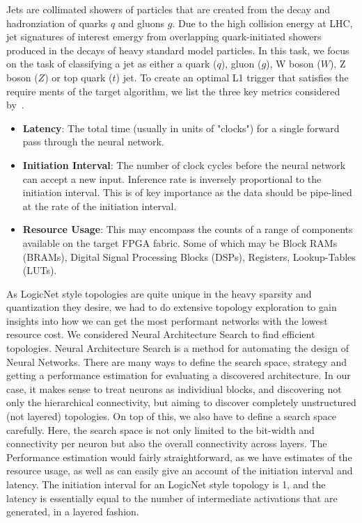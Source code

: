 Jets are collimated showers of particles that are created from the decay and hadronziation of quarks $q$ and gluons $g$. Due to the high collision energy at LHC, jet signatures of interest emergy from overlapping quark-initiated showers produced in the decays of heavy standard model particles.
In this task, we focus on the task of classifying a jet as either a quark ($q$), gluon ($g$), W boson ($W$), Z boson ($Z$) or top quark ($t$) jet. 
To create an optimal L1 trigger that satisfies the require  ments of the target algorithm, we list the three key metrics considered by~\cite{Duarte_2018}. 
\begin{itemize}
    \item \textbf{Latency}: The total time (usually in units of "clocks") for a single forward pass through the neural network.
    \item \textbf{Initiation Interval}: The number of clock cycles before the neural network can accept a new input. Inference rate is inversely proportional to the initiation interval. This is of key importance as the data should be pipe-lined at the rate of the initiation interval.
    \item \textbf{Resource Usage}: This may encompass the counts of a range of components available on the target FPGA fabric. Some of which may be Block RAMs (BRAMs), Digital Signal Processing Blocks (DSPs), Registers, Lookup-Tables (LUTs).
\end{itemize}
As LogicNet style topologies are quite unique in the heavy sparsity and quantization they desire, we had to do extensive topology exploration to gain insights into how we can get the most performant networks with the lowest resource cost.
We considered Neural Architecture Search to find efficient topologies. Neural Architecture Search is a method for automating the design of Neural Networks. There are many ways to define the search space, strategy and getting a performance estimation for evaluating a discovered architecture. In our case, it makes sense to treat neurons as individiual blocks, and discovering not only the hierarchical connectivity, but aiming to discover completely unstructured (not layered) topologies. On top of this, we also have to define a search space carefully. Here, the search space is not only limited to the bit-width and connectivity per neuron but also the overall connectivity across layers. The Performance estimation would fairly straightforward, as we have estimates of the resource usage, as well as can easily give an account of the initiation interval and latency. The initiation interval for an LogicNet style topology is 1, and the latency is essentially equal to the number of intermediate activations that are generated, in a layered fashion.
